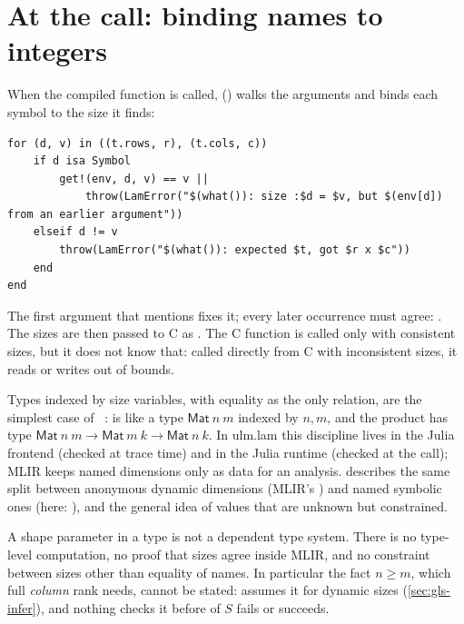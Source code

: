 \section{At the call: binding names to integers}
\label{sec:shapes-runtime}

When the compiled function is called, 
() walks the arguments and
binds each symbol to the size it finds:

\begin{lstlisting}[style=jl]
for (d, v) in ((t.rows, r), (t.cols, c))
    if d isa Symbol
        get!(env, d, v) == v ||
            throw(LamError("$(what()): size :$d = $v, but $(env[d]) from an earlier argument"))
    elseif d != v
        throw(LamError("$(what()): expected $t, got $r x $c"))
    end
end
\end{lstlisting}

The first argument that mentions  fixes it; every later
occurrence must agree: . The sizes are then passed to C as . The C
function is called only with consistent sizes, but it does not know that:
called directly from C with inconsistent sizes, it reads or writes out of
bounds.

\begin{theory}
Types indexed by size variables, with equality as the only relation, are
the simplest case of ~\cite{dml}:  is like a type \(\mathsf{Mat}\ n\ m\) indexed by \(n,m\), and the
product has type \(\mathsf{Mat}\ n\ m \to \mathsf{Mat}\ m\ k \to
\mathsf{Mat}\ n\ k\). In ulm.lam this discipline lives in the Julia frontend
(checked at trace time) and in the Julia runtime (checked at the call);
MLIR keeps named dimensions only as data for an analysis.
 describes the same split between
anonymous dynamic dimensions (MLIR's ) and named symbolic ones
(here: ), and  the
general idea of values that are unknown but constrained.
\end{theory}

\begin{limit}
A shape parameter in a type is not a dependent type system. There is no
type-level computation, no proof that sizes agree inside MLIR, and no
constraint between sizes other than equality of names. In particular the
fact \(n \ge m\), which full \emph{column} rank needs, cannot be stated:
 assumes it for dynamic sizes
(\cref{sec:gls-infer}), and nothing checks it before  of \(S\)
fails or succeeds.
\end{limit}

